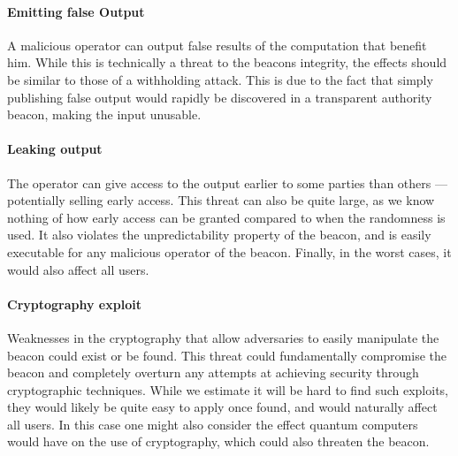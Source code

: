 \paragraph{Emitting false Output} A malicious operator can output false results of the computation that benefit him. While this is technically a threat to the beacons integrity, the effects should be similar to those of a withholding attack. This is due to the fact that simply publishing false output would rapidly be discovered in a transparent authority beacon, making the input unusable.
\paragraph{Leaking output} The operator can give access to the output earlier to some parties than others --- potentially selling early access. This threat can also be quite large, as we know nothing of how early access can be granted compared to when the randomness is used. It also violates the unpredictability property of the beacon, and is easily executable for any malicious operator of the beacon. Finally, in the worst cases, it would also affect all users.
\paragraph{Cryptography exploit} Weaknesses in the cryptography that allow adversaries to easily manipulate the beacon could exist or be found. This threat could fundamentally compromise the beacon and completely overturn any attempts at achieving security through cryptographic techniques. While we estimate it will be hard to find such exploits, they would likely be quite easy to apply once found, and would naturally affect all users. In this case one might also consider the effect quantum computers would have on the use of cryptography, which could also threaten the beacon.
